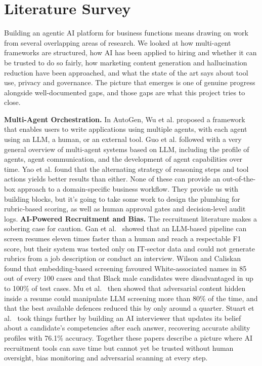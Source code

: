 ﻿%

\section{Literature Survey}

Building an agentic AI platform for business functions means drawing on work from several overlapping areas of research. We looked at how multi-agent frameworks are structured, how AI has been applied to hiring and whether it can be trusted to do so fairly, how marketing content generation and hallucination reduction have been approached, and what the state of the art says about tool use, privacy and governance. The picture that emerges is one of genuine progress alongside well-documented gaps, and those gaps are what this project tries to close.

\vspace{10pt}
\noindent\textbf{Multi-Agent Orchestration.}
In AutoGen, Wu et al. \cite{autogen} proposed a framework that enables users to write applications using multiple agents, with each agent using an LLM, a human, or an external tool. Guo et al. \cite{guo} followed with a very general overview of multi-agent systems based on LLM, including the profile of agents, agent communication, and the development of agent capabilities over time. Yao et al.\cite{react} found that the alternating strategy of reasoning steps and tool actions yields better results than either. None of these can provide an out-of-the-box approach to a domain-specific business workflow. They provide us with building blocks, but it's going to take some work to design the plumbing for rubric-based scoring, as well as human approval gates and decision-level audit logs.
\vspace{10pt}
\noindent\textbf{AI-Powered Recruitment and Bias.}
The recruitment literature makes a sobering case for caution. Gan et al.\ \cite{gan} showed that an LLM-based pipeline can screen resumes eleven times faster than a human and reach a respectable F1 score, but their system was tested only on IT-sector data and could not generate rubrics from a job description or conduct an interview. Wilson and Caliskan \cite{wilson} found that embedding-based screening favoured White-associated names in 85 out of every 100 cases and that Black male candidates were disadvantaged in up to 100\% of test cases. Mu et al.\ \cite{mu} then showed that adversarial content hidden inside a resume could manipulate LLM screening more than 80\% of the time, and that the best available defences reduced this by only around a quarter. Stuart et al.\ \cite{stuart} took things further by building an AI interviewer that updates its belief about a candidate's competencies after each answer, recovering accurate ability profiles with 76.1\% accuracy. Together these papers describe a picture where AI recruitment tools can save time but cannot yet be trusted without human oversight, bias monitoring and adversarial scanning at every step.

